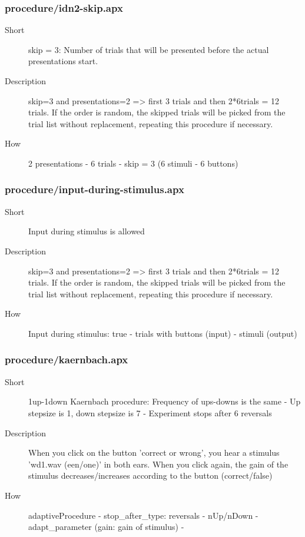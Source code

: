 \subsubsection{procedure/idn2-skip.apx}
\begin{description}
\item[Short] 
 skip = 3: Number of trials that will be presented before the actual presentations start.
\item[Description] 
 skip=3 and presentations=2 =\textgreater{} first 3 trials and then 2*6trials = 12 trials. If the order is random, the skipped trials will be picked from the trial list without replacement, repeating this procedure if necessary.
\item[How] 
 2 presentations - 6 trials - skip = 3 (6 stimuli - 6 buttons)
\end{description}

\subsubsection{procedure/input-during-stimulus.apx}
\begin{description}
\item[Short] 
 Input during stimulus is allowed
\item[Description] 
 skip=3 and presentations=2 =\textgreater{} first 3 trials and then 2*6trials = 12 trials. If the order is random, the skipped trials will be picked from the trial list without replacement, repeating this procedure if necessary.
\item[How] 
 Input during stimulus: true - trials with buttons (input) - stimuli (output)
\end{description}

\subsubsection{procedure/kaernbach.apx}
\begin{description}
\item[Short] 
 1up-1down Kaernbach procedure: Frequency of ups-downs is the same - Up stepsize is 1, down stepsize is 7 - Experiment stops after 6 reversals
\item[Description] 
 When you click on the button 'correct or wrong', you hear a stimulus 'wd1.wav (een/one)' in both ears. When you click again, the gain of the stimulus decreases/increases according to the button (correct/false)
\item[How] 
 adaptiveProcedure - stop\_after\_type: reversals - nUp/nDown - adapt\_parameter (gain: gain of stimulus) -
\end{description}

